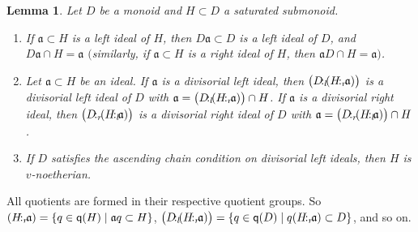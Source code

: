 \documentclass[a4paper]{amsart}
\newtheorem{lemma}[theorem]{Lemma}
\theoremstyle{definition}
\numberwithin{equation}{section}
\begin{document}
\medskip
\begin{lemma} \label{4.9}
Let $D$ be a monoid and $H \subset D$ a saturated submonoid.
\begin{enumerate}

\item If $\mathfrak a \subset H$ is a left ideal of $H$, then $D
      \mathfrak a \subset D$ is a left ideal of $D$, and $D \mathfrak a
      \cap H = \mathfrak a$ $($similarly, if $\mathfrak a \subset H$ is a right ideal of
      $H$, then $\mathfrak a D \cap H = \mathfrak a$$)$.

\smallskip
\item Let $\mathfrak a \subset H$ be an ideal. If $\mathfrak a$ is a divisorial left ideal,
      then $\big(D {\negthinspace :_l \negthinspace} (H {\negthinspace :_r \negthinspace} \mathfrak a)\big)$ is a divisorial left
      ideal of $D$ with $\mathfrak a = \big(D {\negthinspace :_l \negthinspace} (H {\negthinspace :_r \negthinspace} \mathfrak a)\big) \cap H$. If $\mathfrak a$ is a divisorial right ideal,
      then $\big(D {\negthinspace :_r \negthinspace} (H {\negthinspace :_l \negthinspace} \mathfrak a)\big)$ is a
      divisorial right ideal of $D$ with $\mathfrak a = \big(D {\negthinspace :_r \negthinspace} (H {\negthinspace :_l \negthinspace} \mathfrak a)\big) \cap H$.

\smallskip
\item If $D$ satisfies the ascending chain condition on divisorial
      left ideals, then $H$ is $v$-noetherian.
\end{enumerate}
\end{lemma}

\smallskip
{} All quotients are formed in their respective
quotient groups. So $(H {\negthinspace :_r \negthinspace} \mathfrak a) = \{ q \in \mathsf q (H)
\mid \mathfrak a q \subset H\}$, $\big(D {\negthinspace :_l \negthinspace} (H {\negthinspace :_r \negthinspace} \mathfrak
a)\big) = \{ q \in \mathsf q (D) \mid q (H {\negthinspace :_r \negthinspace} \mathfrak a) \subset
D \}$, and so on.
\end{document}
